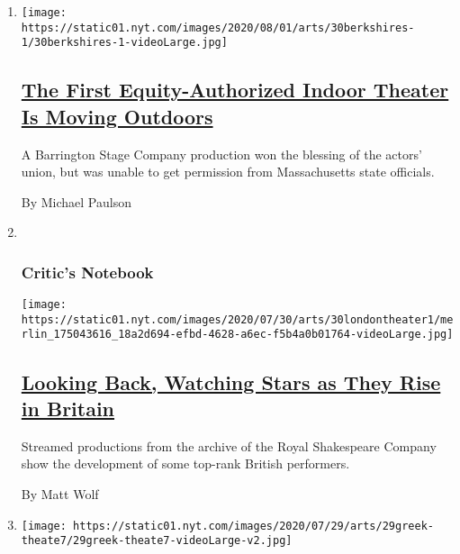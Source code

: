 \begin{enumerate}
\def\labelenumi{\arabic{enumi}.}
\item
  \texttt{[image: https://static01.nyt.com/images/2020/08/01/arts/30berkshires-1/30berkshires-1-videoLarge.jpg]}

  \hypertarget{the-first-equity-authorized-indoor-theater-is-moving-outdoors}{%
  \subsection{\texorpdfstring{\href{/2020/07/30/theater/the-first-equity-authorized-indoor-theater-is-moving-outdoors.html}{The
  First Equity-Authorized Indoor Theater Is Moving
  Outdoors}}{The First Equity-Authorized Indoor Theater Is Moving Outdoors}}\label{the-first-equity-authorized-indoor-theater-is-moving-outdoors}}

  A Barrington Stage Company production won the blessing of the actors'
  union, but was unable to get permission from Massachusetts state
  officials.

  By Michael Paulson
\item ~
  \hypertarget{critics-notebook}{%
  \subsubsection{Critic's Notebook}\label{critics-notebook}}

  \texttt{[image: https://static01.nyt.com/images/2020/07/30/arts/30londontheater1/merlin\_175043616\_18a2d694-efbd-4628-a6ec-f5b4a0b01764-videoLarge.jpg]}

  \hypertarget{looking-back-watching-stars-as-they-rise-in-britain}{%
  \subsection{\texorpdfstring{\href{/2020/07/30/theater/patsy-ferran-michelle-terry-lucian-msamati.html}{Looking
  Back, Watching Stars as They Rise in
  Britain}}{Looking Back, Watching Stars as They Rise in Britain}}\label{looking-back-watching-stars-as-they-rise-in-britain}}

  Streamed productions from the archive of the Royal Shakespeare Company
  show the development of some top-rank British performers.

  By Matt Wolf
\item
  \texttt{[image: https://static01.nyt.com/images/2020/07/29/arts/29greek-theate7/29greek-theate7-videoLarge-v2.jpg]}

  \hypertarget{for-greeces-theaters-the-coronavirus-is-a-tragedy}{%
}
\end{enumerate}
